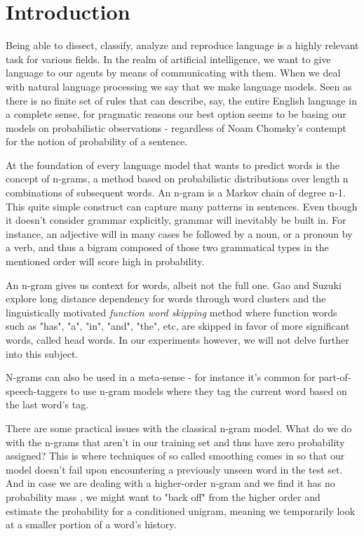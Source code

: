 \documentclass[a4paper,12pt]{article}
\begin{document}
\section{Introduction}
\label{sec:intro}

Being able to dissect, classify, analyze and reproduce language is a highly relevant task for various fields. In the realm of artificial intelligence, we want to give language to our agents by means of communicating with them. When we deal with natural language processing we say that we make language models. Seen as there is no finite set of rules that can describe, say, the entire English language in a complete sense, for pragmatic reasons our best option seems to be basing our models on probabilistic observations - regardless of Noam Chomsky's contempt\cite{JurafskyBook} for the notion of probability of a sentence.

At the foundation of every language model that wants to predict words is the concept of n-grams, a method based on probabilistic distributions over length n combinations of subsequent words. An n-gram is a Markov chain of degree n-1. This quite simple construct can capture many patterns in sentences. Even though it doesn't consider grammar explicitly, grammar will inevitably be built in. For instance, an adjective will in many cases be followed by a noun, or a pronoun by a verb, and thus a bigram composed of those two grammatical types in the mentioned order will score high in probability. 

An n-gram gives us context for words, albeit not the full one. Gao and Suzuki\cite{gao2004long} explore long distance dependency for words through word clusters and the linguistically motivated {\it function word skipping} method where function words such as "has", "a", "in", "and", "the", etc, are skipped in favor of more significant words, called head words. In our experiments however, we will not delve further into this subject.

N-grams can also be used in a meta-sense - for instance it's common for part-of-speech-taggers to use n-gram models where they tag the current word based on the last word's tag.

There are some practical issues with the classical n-gram model. What do we do with the n-grams that aren't in our training set and thus have zero probability assigned? This is where techniques of so called smoothing comes in so that our model doesn't fail upon encountering a previously unseen word in the test set. And in case we are dealing with a higher-order n-gram and we find it has no probability mass , we might want to "back off" from the higher order and estimate the probability for a conditioned unigram, meaning we temporarily look at a smaller portion of a word's history.
\end{document}
